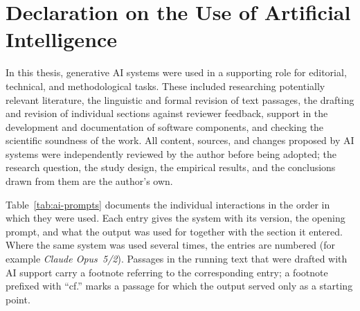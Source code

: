 \chapter*{Declaration on the Use of Artificial Intelligence}
\label{chap:ai-usage}

In this thesis, generative AI systems were used in a supporting role for editorial,
technical, and methodological tasks. These included researching potentially relevant
literature, the linguistic and formal revision of text passages, the drafting and
revision of individual sections against reviewer feedback, support in the development
and documentation of software components, and checking the scientific soundness of the
work. All content, sources, and changes proposed by AI systems were independently
reviewed by the author before being adopted; the research question, the study design,
the empirical results, and the conclusions drawn from them are the author's own.

Table~\ref{tab:ai-prompts} documents the individual interactions in the order in which
they were used. Each entry gives the system with its version, the opening prompt, and
what the output was used for together with the section it entered. Where the same system
was used several times, the entries are numbered (for example \emph{Claude Opus~5/2}).
Passages in the running text that were drafted with AI support carry a footnote
referring to the corresponding entry; a footnote prefixed with ``cf.'' marks a passage
for which the output served only as a starting point.

